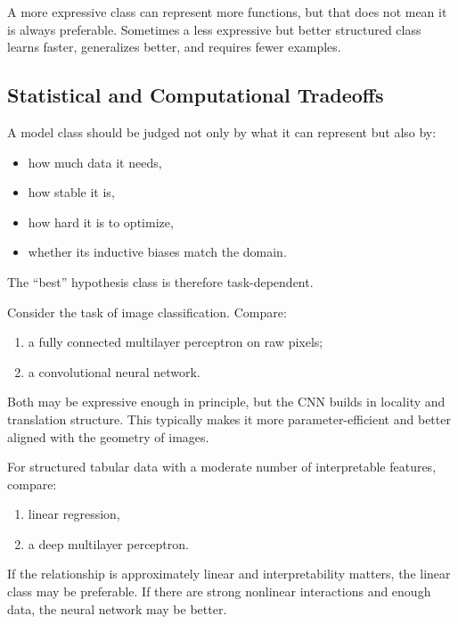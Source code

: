 A more expressive class can represent more functions, but that does not mean it is always preferable. Sometimes a less expressive but better structured class learns faster, generalizes better, and requires fewer examples.

\subsection{Statistical and Computational Tradeoffs}

A model class should be judged not only by what it can represent but also by:
\begin{itemize}
    \item how much data it needs,
    \item how stable it is,
    \item how hard it is to optimize,
    \item whether its inductive biases match the domain.
\end{itemize}

The ``best'' hypothesis class is therefore task-dependent.

\begin{example}
Consider the task of image classification. Compare:
\begin{enumerate}
    \item a fully connected multilayer perceptron on raw pixels;
    \item a convolutional neural network.
\end{enumerate}
Both may be expressive enough in principle, but the CNN builds in locality and translation structure. This typically makes it more parameter-efficient and better aligned with the geometry of images.
\end{example}

\begin{example}
For structured tabular data with a moderate number of interpretable features, compare:
\begin{enumerate}
    \item linear regression,
    \item a deep multilayer perceptron.
\end{enumerate}
If the relationship is approximately linear and interpretability matters, the linear class may be preferable. If there are strong nonlinear interactions and enough data, the neural network may be better.
\end{example}

